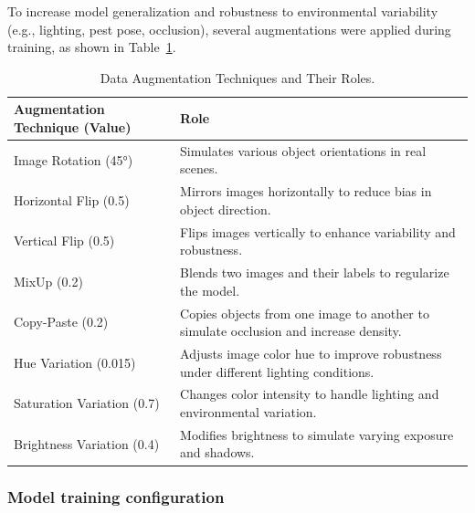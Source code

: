 To increase model generalization and robustness to environmental variability (e.g., lighting, pest pose, occlusion), several augmentations were applied during training, as shown in Table~\ref{tab:augmentations}.


\begin{table}[H]
    \caption{Data Augmentation Techniques and Their Roles.}
    \centering
    \begin{tabular}{|p{5cm}|p{8cm}|}
    \hline
    \textbf{Augmentation Technique (Value)} & \textbf{Role} \\
    \hline
    Image Rotation (45°) & Simulates various object orientations in real scenes. \\
    \hline
    Horizontal Flip (0.5) & Mirrors images horizontally to reduce bias in object direction. \\
    \hline
    Vertical Flip (0.5) & Flips images vertically to enhance variability and robustness. \\
    \hline
    MixUp (0.2) & Blends two images and their labels to regularize the model. \\
    \hline
    Copy-Paste (0.2) & Copies objects from one image to another to simulate occlusion and increase density. \\
    \hline
    Hue Variation (0.015) & Adjusts image color hue to improve robustness under different lighting conditions. \\
    \hline
    Saturation Variation (0.7) & Changes color intensity to handle lighting and environmental variation. \\
    \hline
    Brightness Variation (0.4) & Modifies brightness to simulate varying exposure and shadows. \\
    \hline
    \end{tabular}
    \label{tab:augmentations}
\end{table}


\subsubsection{Model training configuration}

